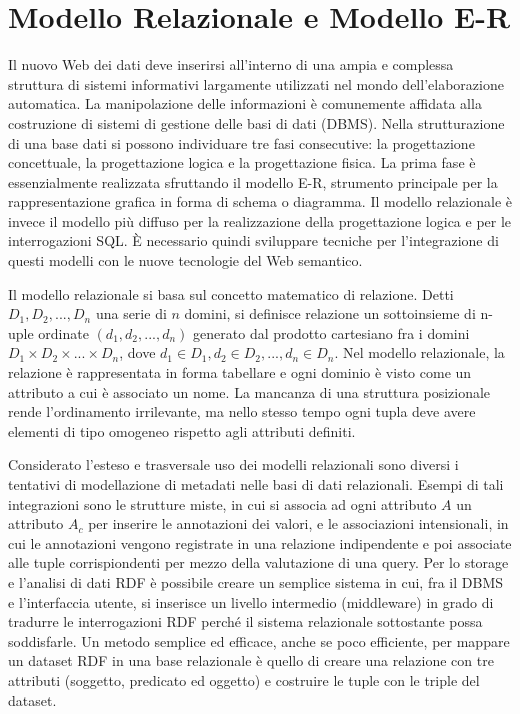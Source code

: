 \documentclass[Lau,binding=0.6cm,noexaminfo,oneside]{sapthesis}
\begin{document}
\section{Modello Relazionale e Modello E-R}

Il nuovo Web dei dati deve inserirsi all'interno di una ampia e complessa struttura di sistemi informativi largamente utilizzati nel mondo dell'elaborazione automatica. La manipolazione delle informazioni è comunemente affidata alla costruzione di sistemi di gestione delle basi di dati (DBMS). Nella strutturazione di una base dati si possono individuare tre fasi consecutive: la progettazione concettuale, la progettazione logica e la progettazione fisica.
La prima fase è essenzialmente realizzata sfruttando il modello E-R, strumento principale per la rappresentazione grafica in forma di schema o diagramma. Il modello relazionale è invece il modello più diffuso per la realizzazione della progettazione logica e per le interrogazioni SQL. \MakeUppercase{è} necessario quindi sviluppare tecniche per l'integrazione di questi modelli con le nuove tecnologie del Web semantico.\medskip

Il modello relazionale si basa sul concetto matematico di relazione. Detti $D_1, D_2, ..., D_n$ una serie di $n$ domini, si definisce relazione un sottoinsieme di n-uple ordinate $(d_1, d_2, ..., d_n)$ generato dal prodotto cartesiano fra i domini $D_1 \times D_2 \times ... \times D_n$, dove $d_1 \! \in \! D_1, d_2 \! \in \! D_2, ..., d_n \! \in \! D_n$.
Nel modello relazionale, la relazione è rappresentata in forma tabellare e ogni dominio è visto come un attributo a cui è associato un nome. La mancanza di una struttura posizionale rende l'ordinamento irrilevante, ma nello stesso tempo ogni tupla deve avere elementi di tipo omogeneo rispetto agli attributi definiti.\medskip

Considerato l'esteso e trasversale uso dei modelli relazionali sono diversi i tentativi di modellazione di metadati nelle basi di dati relazionali. Esempi di tali integrazioni sono le strutture miste, in cui si associa ad ogni attributo $A$ un attributo $A_c$ per inserire le annotazioni dei valori, e le associazioni intensionali, in cui le annotazioni vengono registrate in una relazione indipendente e poi associate alle tuple corrispiondenti per mezzo della valutazione di una query.
Per lo storage e l'analisi di dati RDF è possibile creare un semplice sistema in cui, fra il DBMS e l'interfaccia utente, si inserisce un livello intermedio (middleware) in grado di tradurre le interrogazioni RDF perché il sistema relazionale sottostante possa soddisfarle. Un metodo semplice ed efficace, anche se poco efficiente, per mappare un dataset RDF in una base relazionale è quello di creare una relazione con tre attributi (soggetto, predicato ed oggetto) e costruire le tuple con le triple del dataset.\medskip
\end{document}
